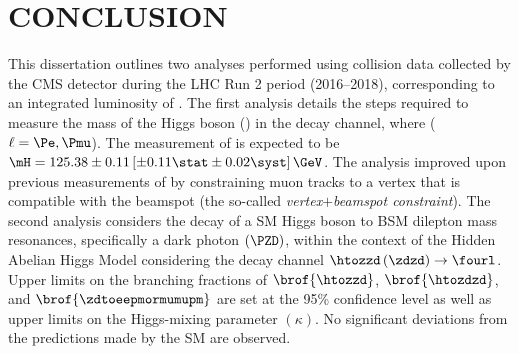 \chapter{CONCLUSION}
\label{ch:conclusion}
This dissertation outlines two analyses performed using \pp collision data collected by the CMS detector during the LHC Run 2 period (2016--2018), corresponding to an integrated luminosity of \lumiruntwo.
The first analysis details the steps required to measure the mass of the Higgs boson (\mH) in the \hzzfourl decay channel, where ($\ell = \Pe, \Pmu$).
The measurement of \mH is expected to be $\mH = 125.38 \pm 0.11 \left[\pm 0.11 \stat \pm 0.02\syst \right] \GeV$.  %
The analysis improved upon previous measurements of \mH by constraining muon tracks to a vertex that is compatible with the beamspot (the so-called \emph{vertex$+$beamspot constraint}).
The second analysis considers the decay of a SM Higgs boson to BSM dilepton mass resonances, specifically a dark photon $\left( \PZD \right)$, within the context of the Hidden Abelian Higgs Model considering the decay channel $\htozzd \left( \zdzd \right) \to \fourl$.
Upper limits on the branching fractions of $\brof{\htozzd}$, $\brof{\htozdzd}$, and $\brof{\zdtoeepmormumupm}$ are set at the 95\% confidence level as well as upper limits on the Higgs-mixing parameter $(\kappa)$.
No significant deviations from the predictions made by the SM are observed.